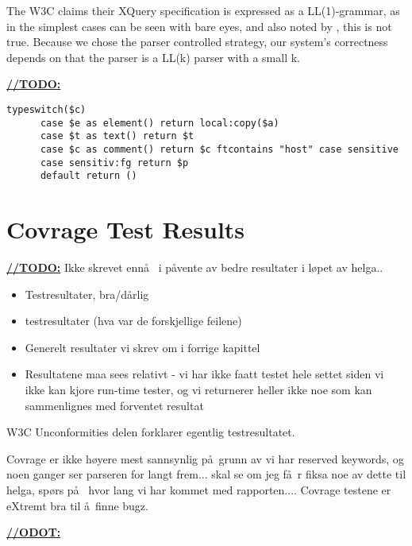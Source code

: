 The W3C claims their XQuery specification is expressed as a LL(1)-grammar\cite{createTokenizer}, as in the simplest cases can be seen with bare eyes, and also noted by \cite{kang_xquery_diglib}, this is not true. Because we chose the parser controlled strategy, our system's correctness depends on that the parser is a LL(k) parser with a small k.

\underline{\textbf{\LARGE //TODO:}}
\begin{verbatim}
typeswitch($c) 
      case $e as element() return local:copy($a)
      case $t as text() return $t
      case $c as comment() return $c ftcontains "host" case sensitive
      case sensitiv:fg return $p
      default return ()
\end{verbatim}




\section{Covrage Test Results}
\label{sect:discussion:coverageResults}
\underline{\textbf{\LARGE //TODO:}} Ikke skrevet enn\aa~ i p\aa vente av bedre resultater i l\o pet av helga..
\begin{itemize}
\item Testresultater, bra/d\aa rlig
\item testresultater (hva var de forskjellige feilene)
\item Generelt resultater vi skrev om i forrige kapittel
\item Resultatene maa sees relativt - vi har ikke faatt testet hele settet siden
vi ikke kan kjore run-time tester, og vi returnerer heller ikke noe som kan
sammenlignes med forventet resultat
\end{itemize}

W3C Unconformities delen forklarer egentlig testresultatet.

Covrage er ikke h\o yere mest sannsynlig p\aa~grunn av vi har reserved keywords, og noen ganger ser parseren for langt frem... skal se om jeg f\aa~r fiksa noe av dette til helga, sp\o rs p\aa~ hvor lang vi har kommet med rapporten.... Covrage testene er eXtremt bra til \aa~finne bugz.

\underline{\textbf{\LARGE //ODOT:}}